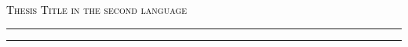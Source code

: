 \begin{center}
\chaptitlefont %
\begin{center}\textcolor{black}{\textsc{Thesis Title in the second language}}
\end{center}
\end{center}
\vspace{8mm}
\textcolor{black}{\hrule height 4.5pt}%
\vspace{1mm}
\textcolor{black}{\hrule height 1.5pt}